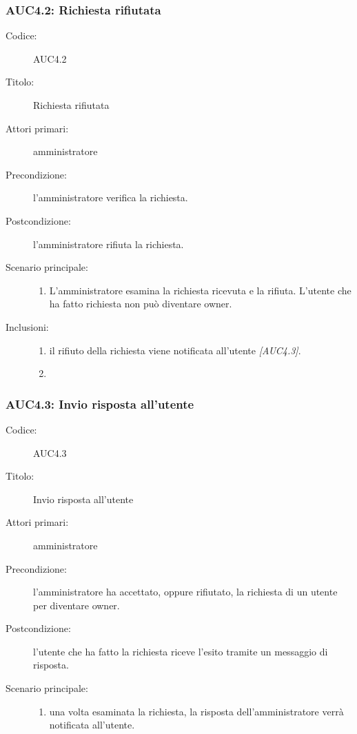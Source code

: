 \documentclass[../../../analisi-dei-requisiti.tex]{subfiles}
\begin{document}
\subsubsection{AUC4.2: Richiesta rifiutata}%
\label{subs:AUC4.2}

\begin{description}
  \item[Codice:] AUC4.2
  \item[Titolo:] Richiesta rifiutata
  \item[Attori primari:] amministratore
  \item[Precondizione:] l'amministratore verifica la richiesta.
  \item[Postcondizione:] l'amministratore rifiuta la richiesta.
  \item[Scenario principale:]
  \begin{enumerate}
    \item L'amministratore esamina la richiesta ricevuta e la rifiuta. L'utente che ha fatto richiesta non può diventare owner.
  \end{enumerate}
  \item[Inclusioni:]
  \begin{enumerate}
    \item il rifiuto della richiesta viene notificata all'utente \emph{[AUC4.3]}.
    \item
  \end{enumerate}
\end{description}

\subsubsection{AUC4.3: Invio risposta all'utente}%
\label{subs:AUC4.3}

\begin{description}
  \item[Codice:] AUC4.3
  \item[Titolo:] Invio risposta all'utente
  \item[Attori primari:] amministratore
  \item[Precondizione:] l'amministratore ha accettato, oppure rifiutato, la richiesta di un utente per diventare owner.
  \item[Postcondizione:] l'utente che ha fatto la richiesta riceve l'esito tramite un messaggio di risposta.
  \item[Scenario principale:]
  \begin{enumerate}
    \item una volta esaminata la richiesta, la risposta dell'amministratore verrà notificata all'utente.
  \end{enumerate}
\end{description}
\end{document}
